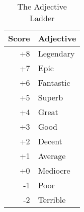 
\begin{wraptable}{r}[1cm]{3.5cm}
\centering
\begin{tabular}{r@{:\quad}l}
\toprule
Score	& Adjective \\
\midrule
+8	& Legendary \\
+7	& Epic \\
+6	& Fantastic \\
+5	& Superb \\
+4	& Great \\
+3	& Good \\
+2	& Decent \\
+1	& Average \\
+0	& Mediocre \\
-1	& Poor \\
-2	& Terrible \\
\bottomrule
\end{tabular}
\caption{The Adjective Ladder}
\label{tab:the-ladder}
\end{wraptable}

